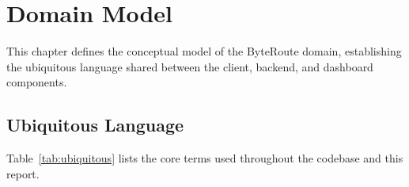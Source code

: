 \documentclass[12pt]{report}
\begin{document}
\chapter{Domain Model}
\label{chap:domain}

This chapter defines the conceptual model of the ByteRoute domain, establishing
the ubiquitous language shared between the client, backend, and dashboard
components.

\section{Ubiquitous Language}

Table~\ref{tab:ubiquitous} lists the core terms used throughout the codebase
and this report.
\end{document}
